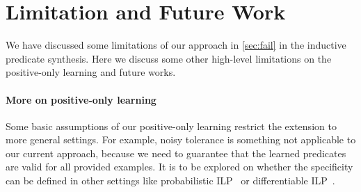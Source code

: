 \section{Limitation and Future Work}
\label{sec:limit}

We have discussed some limitations of our approach in
\autoref{sec:fail} in the inductive predicate synthesis. Here we
discuss some other high-level limitations on the positive-only
learning and future works.

\paragraph{More on positive-only learning}




Some basic assumptions of our positive-only learning restrict the
extension to more general settings. For example, noisy tolerance is
something not applicable to our current approach, because we need to
guarantee that the learned predicates are valid for all provided
examples. It is to be explored on whether the specificity can be
defined in other settings like probabilistic
ILP~\cite{de2008probabilistic} or differentiable
ILP~\cite{evans2018learning}.


